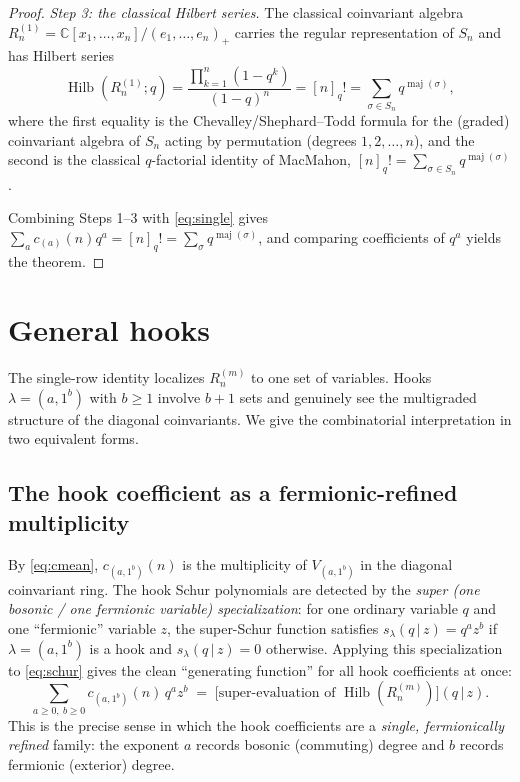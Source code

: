 \documentclass[11pt]{article}
\theoremstyle{definition}
\theoremstyle{remark}
\newcommand{\maj}{\operatorname{maj}}
\newcommand{\Hilb}{\operatorname{Hilb}}
\newcommand{\CC}{\mathbb{C}}
\begin{document}
\begin{proof}
\emph{Step 3: the classical Hilbert series.}
The classical coinvariant algebra $R_n^{(1)}=\CC[x_1,\dots,x_n]/(e_1,\dots,e_n)_+$ carries
the regular representation of $S_n$ and has Hilbert series
\[
\Hilb(R_n^{(1)};q)=\frac{\prod_{k=1}^{n}(1-q^{k})}{(1-q)^{n}}=[n]_q!
=\sum_{\sigma\in S_n}q^{\maj(\sigma)} ,
\]
where the first equality is the Chevalley/Shephard--Todd formula for the (graded) coinvariant
algebra of $S_n$ acting by permutation (degrees $1,2,\dots,n$), and the second is the classical
$q$-factorial identity of MacMahon, $[n]_q!=\sum_{\sigma\in S_n}q^{\maj(\sigma)}$.

Combining Steps 1--3 with \eqref{eq:single} gives
$\sum_a c_{(a)}(n)q^{a}=[n]_q!=\sum_{\sigma}q^{\maj(\sigma)}$, and comparing coefficients of
$q^a$ yields the theorem.
\end{proof}

\section{General hooks}

The single-row identity localizes $R_n^{(m)}$ to one set of variables.  Hooks $\lambda=(a,1^b)$
with $b\ge 1$ involve $b+1$ sets and genuinely see the multigraded structure of the diagonal
coinvariants.  We give the combinatorial interpretation in two equivalent forms.

\subsection{The hook coefficient as a fermionic-refined multiplicity}
By \eqref{eq:cmean}, $c_{(a,1^{b})}(n)$ is the multiplicity of $V_{(a,1^{b})}$ in the diagonal
coinvariant ring.  The hook Schur polynomials are detected by the \emph{super
(one bosonic / one fermionic variable) specialization}: for one ordinary variable $q$ and one
``fermionic'' variable $z$, the super-Schur function satisfies
$s_\lambda(q\,|\,z)=q^{a}z^{b}$ if $\lambda=(a,1^{b})$ is a hook and $s_\lambda(q\,|\,z)=0$
otherwise.  Applying this specialization to \eqref{eq:schur} gives the clean ``generating
function'' for all hook coefficients at once:
\begin{equation}\label{eq:hookgf}
\sum_{a\ge 0,\ b\ge 0}c_{(a,1^{b})}(n)\,q^{a}z^{b}
\;=\;\bigl[\text{super-evaluation of }\Hilb(R_n^{(m)})\bigr](q\,|\,z).
\end{equation}
This is the precise sense in which the hook coefficients are a \emph{single, fermionically
refined} family: the exponent $a$ records bosonic (commuting) degree and $b$ records fermionic
(exterior) degree.
\end{document}

